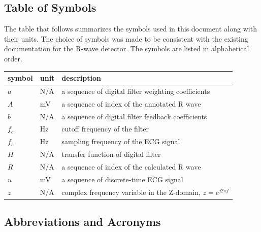 \documentclass[12pt]{article}
\begin{document}
\subsection{Table of Symbols}

The table that follows summarizes the symbols used in this document along with
their units.  The choice of symbols was made to be consistent with the existing
documentation for the R-wave detector.  The symbols are listed in alphabetical
order.

\renewcommand{\arraystretch}{1.2}
\noindent \begin{longtable*}{l l p{12cm}} \toprule \textbf{symbol} &
\textbf{unit} & \textbf{description}\\
\midrule 
$a$ & N/A & a sequence of digital filter weighting coefficients \\
$A$ & \si{\mV} & a sequence of index of the annotated R wave \\
$b$ & N/A & a sequence of digital filter feedback coefficients \\
$f_c$ & \si{\hertz} & cutoff frequency of the filter \\
$f_s$ & \si{\hertz} & sampling frequency of the ECG signal \\
$H$ & N/A & transfer function of digital filter \\
$R$ & N/A & a sequence of index of the calculated R wave \\
$u$ & \si{\mV} & a sequence of discrete-time ECG signal \\
$z$ & N/A & complex frequency variable in the Z-domain, $z=e^{j2\pi f}$ \\
\bottomrule
\end{longtable*}

\subsection{Abbreviations and Acronyms}
\end{document}

